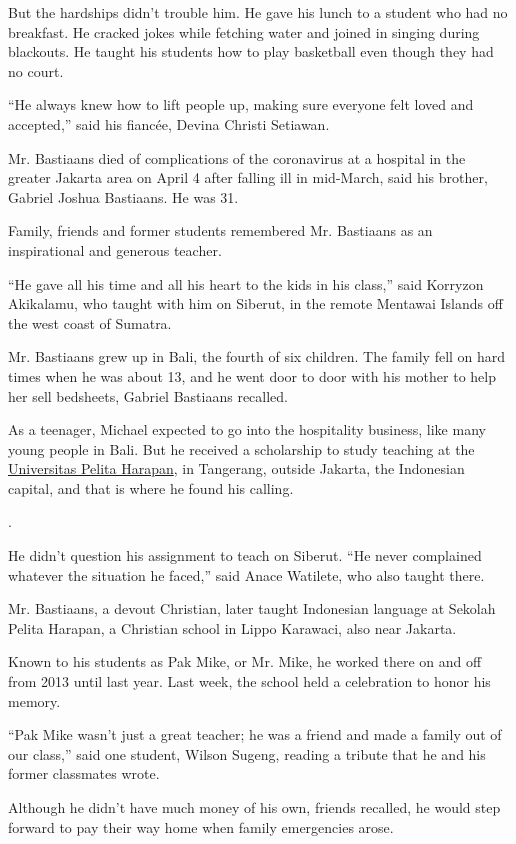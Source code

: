 But the hardships didn't trouble him. He gave his lunch to a student who
had no breakfast. He cracked jokes while fetching water and joined in
singing during blackouts. He taught his students how to play basketball
even though they had no court.

``He always knew how to lift people up, making sure everyone felt loved
and accepted,'' said his fiancée, Devina Christi Setiawan.

Mr. Bastiaans died of complications of the coronavirus at a hospital in
the greater Jakarta area on April 4 after falling ill in mid-March, said
his brother, Gabriel Joshua Bastiaans. He was 31.

Family, friends and former students remembered Mr. Bastiaans as an
inspirational and generous teacher.

``He gave all his time and all his heart to the kids in his class,''
said Korryzon Akikalamu, who taught with him on Siberut, in the remote
Mentawai Islands off the west coast of Sumatra.

Mr. Bastiaans grew up in Bali, the fourth of six children. The family
fell on hard times when he was about 13, and he went door to door with
his mother to help her sell bedsheets, Gabriel Bastiaans recalled.

As a teenager, Michael expected to go into the hospitality business,
like many young people in Bali. But he received a scholarship to study
teaching at the \href{https://www.uph.edu/}{Universitas Pelita Harapan},
in Tangerang, outside Jakarta, the Indonesian capital, and that is where
he found his calling.

.

He didn't question his assignment to teach on Siberut. ``He never
complained whatever the situation he faced,'' said Anace Watilete, who
also taught there.

Mr. Bastiaans, a devout Christian, later taught Indonesian language at
Sekolah Pelita Harapan, a Christian school in Lippo Karawaci, also near
Jakarta.

Known to his students as Pak Mike, or Mr. Mike, he worked there on and
off from 2013 until last year. Last week, the school held a celebration
to honor his memory.

``Pak Mike wasn't just a great teacher; he was a friend and made a
family out of our class,'' said one student, Wilson Sugeng, reading a
tribute that he and his former classmates wrote.

Although he didn't have much money of his own, friends recalled, he
would step forward to pay their way home when family emergencies arose.

